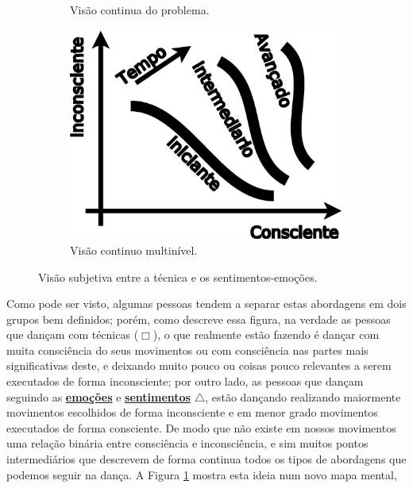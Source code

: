 \begin{figure}[ht]
\begin{subfigure}{.32\textwidth}
      \caption{Visão continua do problema.}
      \label{fig:tecniva-sentimento:b}
    \end{subfigure}
    \hfill
    \begin{subfigure}{.32\textwidth}
      \centering
      \includegraphics[width=.975\linewidth]{chapters/cap-musicalidade-tecnica/tecnica-emotion-3}  
      \caption{Visão continuo multinível.}
      \label{fig:tecniva-sentimento:c}
    \end{subfigure}
    \caption{Visão subjetiva entre a técnica e os sentimentos-emoções.}
    \label{fig:tecniva-sentimento}
\end{figure}
Como pode ser visto, algumas pessoas tendem a separar estas abordagens em dois grupos bem definidos;
porém, como descreve essa figura, na verdade as pessoas que dançam com técnicas ($\Box$),
o que realmente estão fazendo é dançar com muita consciência do seus movimentos
ou com consciência nas partes mais significativas deste,
e deixando muito pouco ou coisas pouco relevantes a serem executados de forma inconsciente;
por outro lado, as pessoas que dançam seguindo as \hyperref[subsec:emotion]{\textbf{emoções}} e 
\hyperref[subsec:filling]{\textbf{sentimentos}} $\bigtriangleup$,
estão dançando realizando maiormente movimentos escolhidos de forma inconsciente 
e em menor grado movimentos executados de forma consciente.
De modo que não existe em nossos movimentos uma relação binária entre consciência e inconsciência,
e sim muitos pontos intermediários que descrevem de forma continua
todos os tipos de abordagens que podemos seguir na dança.
A Figura \ref{fig:tecniva-sentimento:b} mostra esta ideia num novo mapa mental,
